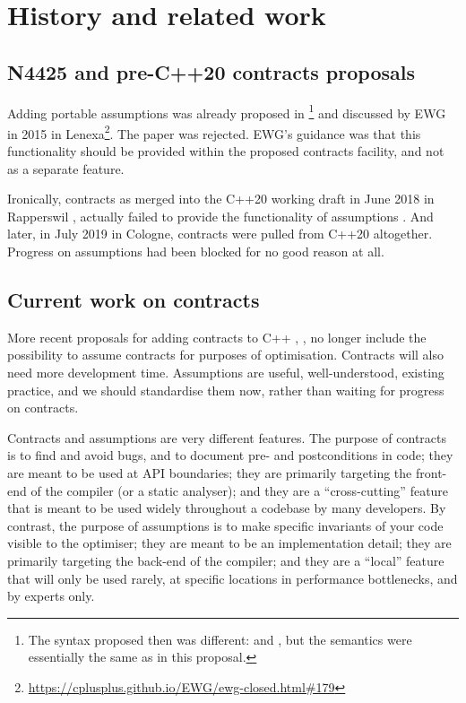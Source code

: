 
\section{History and related work}
\label{sec:history}

\subsection{N4425 and pre-C++20 contracts proposals}
\label{sec:contracts}

Adding portable assumptions was already proposed in \cite{N4425}\footnote{The syntax proposed then was different:  and , but the semantics were essentially the same as in this proposal.} and discussed by EWG in 2015 in Lenexa\footnote{\url{https://cplusplus.github.io/EWG/ewg-closed.html\#179}}. The paper was rejected. EWG's guidance was that this functionality should be provided within the proposed contracts facility, and not as a separate feature.

Ironically, contracts as merged into the C++20 working draft in June 2018 in Rapperswil \cite{P0542R5}, actually failed to provide the functionality of assumptions \cite{P1773R0}. And later, in July 2019 in Cologne, contracts were pulled from C++20 altogether. Progress on assumptions had been blocked for no good reason at all.

\subsection{Current work on contracts}

More recent proposals for adding contracts to C++  \cite{P2388R4}, \cite{P2461R1}, \cite{P2487R0} no longer include the possibility to assume contracts for purposes of optimisation. Contracts will also need more development time. Assumptions are useful, well-understood, existing practice, and we should standardise them now, rather than waiting for progress on contracts.

Contracts and assumptions are very different features. The purpose of contracts is to find and avoid bugs, and to document pre- and postconditions in code; they are meant to be used at API boundaries; they are primarily targeting the front-end of the compiler (or a static analyser); and they are a ``cross-cutting'' feature that is meant to be used widely throughout a codebase by many developers. By contrast, the purpose of assumptions is to make specific invariants of your code visible to the optimiser; they are meant to be an implementation detail; they are primarily targeting the back-end of the compiler; and they are a ``local'' feature that will only be used rarely, at specific locations in performance bottlenecks, and by experts only.

